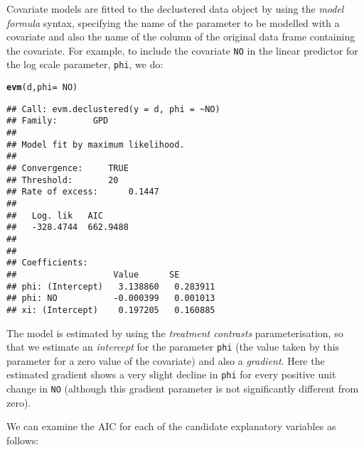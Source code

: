 \documentclass[10pt]{article}\usepackage[]{graphicx}\usepackage[]{color}
\makeatletter
\newcommand{\hlopt}[1]{\textcolor[rgb]{0,0,0}{#1}}%
\newcommand{\hlstd}[1]{\textcolor[rgb]{0.345,0.345,0.345}{#1}}%
\newcommand{\hlkwc}[1]{\textcolor[rgb]{0.333,0.667,0.333}{#1}}%
\newcommand{\hlkwd}[1]{\textcolor[rgb]{0.737,0.353,0.396}{\textbf{#1}}}%
\newenvironment{kframe}{%
 \def\at@end@of@kframe{}%
 \ifinner\ifhmode%
  \def\at@end@of@kframe{\end{minipage}}%
  \begin{minipage}{\columnwidth}%
 \fi\fi%
 \def\FrameCommand##1{\hskip\@totalleftmargin \hskip-\fboxsep
 \colorbox{shadecolor}{##1}\hskip-\fboxsep
     \hskip-\linewidth \hskip-\@totalleftmargin \hskip\columnwidth}%
 \MakeFramed {\advance\hsize-\width
   \@totalleftmargin\z@ \linewidth\hsize
   \@setminipage}}%
 {\par\unskip\endMakeFramed%
 \at@end@of@kframe}
\newenvironment{knitrout}{}{} %
\makeatother
\begin{document}
Covariate models are fitted to the declustered data object by using the {\it model formula} syntax, specifying the name of the parameter to be modelled with a covariate and also the name of the column of the original data frame containing the covariate.  For example, to include the covariate {\tt NO} in the linear predictor for the log scale parameter, {\tt phi}, we do:

\begin{knitrout}
\color{fgcolor}\begin{kframe}
\begin{alltt}
\hlkwd{evm}\hlstd{(d,}\hlkwc{phi}\hlstd{=}\hlopt{~}\hlstd{NO)}
\end{alltt}
\begin{verbatim}
## Call: evm.declustered(y = d, phi = ~NO)
## Family:       GPD 
## 
## Model fit by maximum likelihood.
## 
## Convergence:		TRUE
## Threshold:		20
## Rate of excess:		0.1447
## 
##   Log. lik   AIC     
##   -328.4744  662.9488
## 
## 
## Coefficients:
##                   Value      SE       
## phi: (Intercept)   3.138860   0.283911
## phi: NO           -0.000399   0.001013
## xi: (Intercept)    0.197205   0.160885
\end{verbatim}
\end{kframe}
\end{knitrout}

The model is estimated by using the {\it treatment contrasts} parameterisation, so that we estimate an {\it intercept} for the parameter {\tt phi} (the value taken by this parameter for a zero value of the covariate) and also a {\it gradient}.  Here the estimated gradient shows a very slight decline in {\tt phi} for every positive unit change in {\tt NO} (although this gradient parameter is not significantly different from zero).

We can examine the AIC for each of the candidate explanatory variables as follows:
\end{document}

